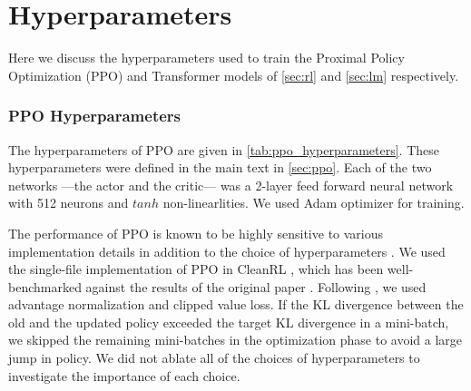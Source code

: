 
\section{Hyperparameters}\label{app:hyperparameters}

Here we discuss the hyperparameters used to train the Proximal Policy Optimization (PPO) and Transformer models of \autoref{sec:rl} and \autoref{sec:lm} respectively.

\subsubsection*{PPO Hyperparameters} 
The hyperparameters of PPO are given in \autoref{tab:ppo_hyperparameters}. These hyperparameters were defined in the main text in \autoref{sec:ppo}. Each of the two networks ---the actor and the critic--- was a 2-layer feed forward neural network with 512 neurons and $tanh$ non-linearlities. We used Adam optimizer for training.


The performance of PPO is known to be highly sensitive to various implementation details in addition to the choice of hyperparameters \cite{shengyi2022the37implementation, engstrom2020implementation}. We used the single-file implementation of PPO in CleanRL \cite{huang2022cleanrl}, which has been well-benchmarked against the results of the original paper \cite{schulman2017proximal}. Following \cite{engstrom2020implementation}, we used advantage normalization and clipped value loss. If the KL divergence between the old and the updated policy exceeded the target KL divergence in a mini-batch, we skipped the remaining mini-batches in the optimization phase to avoid a large jump in policy.
We did not ablate all of the choices of hyperparameters to investigate the importance of each choice.

